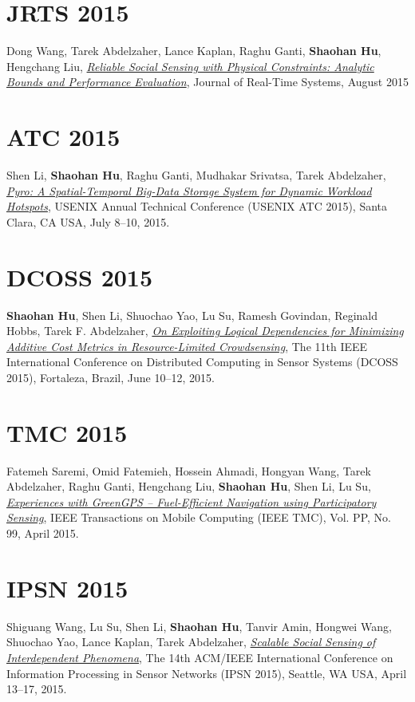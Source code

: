 \section{\sc JRTS 2015}\hypertarget{wang2015jrts}{} Dong Wang, Tarek Abdelzaher, Lance Kaplan, Raghu Ganti, \textbf{Shaohan Hu}, Hengchang Liu, \href{http://link.springer.com/article/10.1007%2Fs11241-015-9238-8}{\emph{Reliable Social Sensing with Physical Constraints: Analytic Bounds and Performance Evaluation}}, \textsf{Journal of Real-Time Systems}, August 2015

\section{\sc ATC 2015}\hypertarget{li2015atc}{} Shen Li, \textbf{Shaohan Hu}, Raghu Ganti, Mudhakar Srivatsa, Tarek Abdelzaher, \href{https://www.usenix.org/system/files/conference/atc15/atc15-paper-li-shen.pdf}{\emph{Pyro: A Spatial-Temporal Big-Data Storage System for Dynamic Workload Hotspots}}, \textsf{USENIX Annual Technical Conference (USENIX ATC 2015)}, Santa Clara, CA USA, July 8--10, 2015.

\section{\sc DCOSS 2015}\hypertarget{hu2015dcoss}{} \textbf{Shaohan Hu}, Shen Li, Shuochao Yao, Lu Su, Ramesh Govindan, Reginald Hobbs, Tarek F. Abdelzaher, \href{http://ieeexplore.ieee.org/xpl/articleDetails.jsp?arnumber=7165037}{\emph{On Exploiting Logical Dependencies for Minimizing Additive Cost Metrics in Resource-Limited Crowdsensing}}, \textsf{The 11th IEEE International Conference on Distributed Computing in Sensor Systems (DCOSS 2015)}, Fortaleza, Brazil, June 10--12, 2015.

\section{\sc TMC 2015}\hypertarget{saremi2015tmc}{} Fatemeh Saremi, Omid Fatemieh, Hossein Ahmadi, Hongyan Wang, Tarek Abdelzaher, Raghu Ganti, Hengchang Liu, \textbf{Shaohan Hu}, Shen Li, Lu Su, \href{http://ieeexplore.ieee.org/xpl/articleDetails.jsp?tp=&arnumber=7084108}{\emph{Experiences with GreenGPS -- Fuel-Efficient Navigation using Participatory Sensing}}, \textsf{IEEE Transactions on Mobile Computing (IEEE TMC)}, Vol. PP, No. 99, April 2015.

\section{\sc IPSN 2015}\hypertarget{wang2015ipsn}{} Shiguang Wang, Lu Su, Shen Li, \textbf{Shaohan Hu}, Tanvir Amin, Hongwei Wang, Shuochao Yao, Lance Kaplan, Tarek Abdelzaher, \href{http://dl.acm.org/citation.cfm?id=2737114}{\emph{Scalable Social Sensing of Interdependent Phenomena}}, \textsf{The 14th ACM/IEEE International Conference on Information Processing in Sensor Networks (IPSN 2015)}, Seattle, WA USA, April 13--17, 2015.

